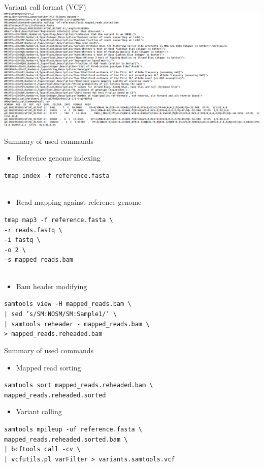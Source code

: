 \documentclass{beamer}
\newcommand{\refindex}[1]{\texttt{tmap index -f #1}}
\newcommand{\tmap}[3]{\texttt{tmap map3 -f #1 \textbackslash \\
    -r #2 \textbackslash \\
    -i fastq \textbackslash \\
    -o 2 \textbackslash \\
    -s #3
  }
}
\newcommand{\sortbam}[2]{\texttt{samtools sort #1 \textbackslash \\ #2}}
\newcommand{\reheader}[2]{\texttt{samtools view -H #1 \textbackslash \\
    | sed 's/SM:NOSM/SM:Sample1/' \textbackslash \\
    | samtools reheader - mapped\_reads.bam \textbackslash \\
    > #2
  }
}
\newcommand{\samtoolssnp}[3]{\texttt{samtools mpileup -uf #1 \textbackslash \\
    #2 \textbackslash \\
    | bcftools call -cv \textbackslash \\
    | vcfutils.pl varFilter > #3
  }
}
\begin{document}
\begin{frame}{Variant call format (VCF)}
  \includegraphics[width=\paperwidth, keepaspectratio]{pic/vcf.png}
\end{frame}


\begin{frame}{Summary of used commands}
  
  \begin{itemize}
    \item Reference genome indexing
  \end{itemize}
  \refindex{reference.fasta}\\~\\

  \begin{itemize}
    \item Read mapping against reference genome
  \end{itemize}
  \tmap{reference.fasta}{reads.fastq}{mapped\_reads.bam}\\~\\
  
  \begin{itemize}
    \item Bam header modifying
  \end{itemize}
  \reheader{mapped\_reads.bam}{mapped\_reads.reheaded.bam}
\end{frame}

\begin{frame}{Summary of used commands}

  \begin{itemize}
    \item Mapped read sorting
  \end{itemize}
  \sortbam{mapped\_reads.reheaded.bam}{mapped\_reads.reheaded.sorted}

  \begin{itemize}
    \item Variant calling
  \end{itemize}
  \samtoolssnp{reference.fasta}{mapped\_reads.reheaded.sorted.bam}{variants.samtools.vcf}
\end{frame}
\end{document}
